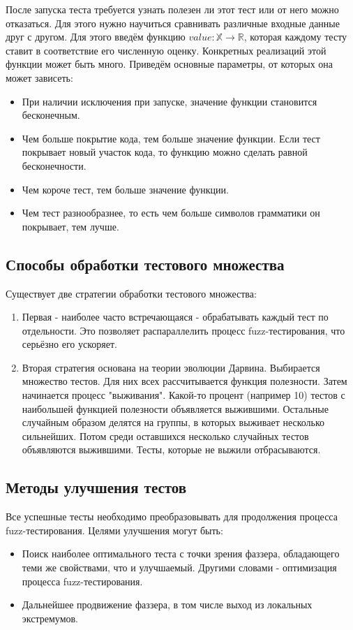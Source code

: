 \documentclass[a4paper]{article}
\begin{document}
После запуска теста требуется узнать полезен ли этот тест или от него можно отказаться. Для этого нужно научиться сравнивать различные входные данные друг с другом.
Для этого введём функцию $value : \mathbb {X} \rightarrow \mathbb {R}$, которая каждому тесту ставит в соответствие его численную оценку. Конкретных реализаций этой функции может быть много. Приведём основные параметры, от которых она может зависеть:
\begin{itemize}
    \item При наличии исключения при запуске, значение функции становится бесконечным.
    \item Чем больше покрытие кода, тем больше значение функции. Если тест покрывает новый участок кода, то функцию можно сделать равной бесконечности.
    \item Чем короче тест, тем больше значение функции.
    \item Чем тест разнообразнее, то есть чем больше символов грамматики он покрывает, тем лучше.
\end{itemize}

\subsection{Способы обработки тестового множества}
\indent

Существует две стратегии обработки тестового множества:

\begin{enumerate}
\item Первая - наиболее часто встречающаяся - обрабатывать каждый тест по отдельности. Это позволяет распараллелить процесс fuzz-тестирования, что серьёзно его ускоряет. 
\item Вторая стратегия основана на теории эволюции Дарвина. Выбирается множество тестов. Для них всех рассчитывается функция полезности. Затем начинается процесс "выживания". Какой-то процент (например 10) тестов с наибольшей функцией полезности объявляется выжившими. Остальные случайным образом делятся на группы, в которых выживает несколько сильнейших. Потом среди оставшихся несколько случайных тестов объявляются выжившими. Тесты, которые не выжили отбрасываются.
\end{enumerate}

\subsection{Методы улучшения тестов}
\indent

Все успешные тесты необходимо преобразовывать для продолжения процесса fuzz-тестирования. Целями улучшения могут быть: 
\begin{itemize}
\item Поиск наиболее оптимального теста с точки зрения фаззера, обладающего теми же свойствами, что и улучшаемый. Другими словами - оптимизация процесса fuzz-тестирования.
\item Дальнейшее продвижение фаззера, в том числе выход из локальных экстремумов.
\end{itemize}
\end{document}
